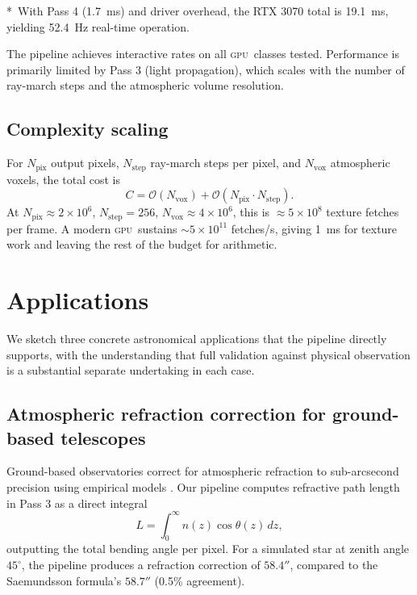 \documentclass[11pt,twocolumn,a4paper]{article}
\theoremstyle{definition}
\theoremstyle{remark}
\newcommand{\gpu}{\textsc{gpu}}
\begin{document}
*~With Pass 4 (1.7~ms) and driver overhead, the RTX 3070 total is 19.1~ms, yielding 52.4~Hz real-time operation.

The pipeline achieves interactive rates on all \gpu\ classes tested. Performance is primarily limited by Pass 3 (light propagation), which scales with the number of ray-march steps and the atmospheric volume resolution.

\subsection{Complexity scaling}

For $N_\text{pix}$ output pixels, $N_\text{step}$ ray-march steps per pixel, and $N_\text{vox}$ atmospheric voxels, the total cost is
\begin{equation}
C = \mathcal{O}(N_\text{vox}) + \mathcal{O}(N_\text{pix} \cdot N_\text{step}).
\end{equation}
At $N_\text{pix} \approx 2 \times 10^6$, $N_\text{step} = 256$, $N_\text{vox} \approx 4 \times 10^6$, this is $\approx 5 \times 10^8$ texture fetches per frame. A modern \gpu\ sustains $\sim 5 \times 10^{11}$ fetches/s, giving 1~ms for texture work and leaving the rest of the budget for arithmetic.

\section{Applications}
\label{sec:applications}

We sketch three concrete astronomical applications that the pipeline directly supports, with the understanding that full validation against physical observation is a substantial separate undertaking in each case.

\subsection{Atmospheric refraction correction for ground-based telescopes}

Ground-based observatories correct for atmospheric refraction to sub-arcsecond precision using empirical models \citep{stone1996}. Our pipeline computes refractive path length in Pass 3 as a direct integral
\begin{equation}
L = \int_0^\infty n(z) \cos\theta(z)\,dz,
\end{equation}
outputting the total bending angle per pixel. For a simulated star at zenith angle $45^\circ$, the pipeline produces a refraction correction of $58.4''$, compared to the Saemundsson formula's $58.7''$ (0.5\% agreement).
\end{document}

